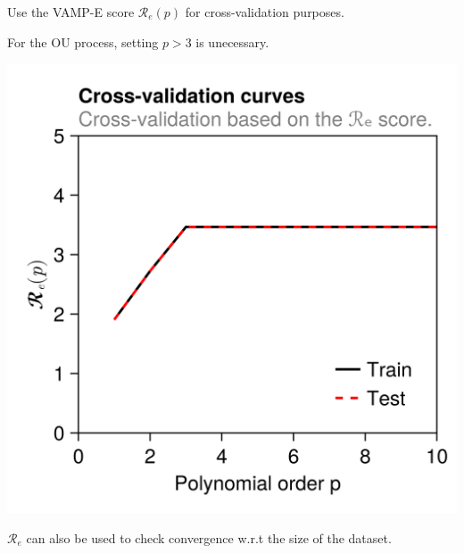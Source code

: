\documentclass[aspectratio=169, usenames, dvipsnames]{beamer}
\begin{document}
{  \begin{frame}
    \vfill
    \begin{minipage}{.48\textwidth}
      Use the VAMP-E score $\mathcal{R}_e(p)$ for cross-validation purposes.

      \bigskip
      
      For the OU process, setting $p > 3$ is unecessary.
    \end{minipage}%
    \hfill
    \begin{minipage}{.48\textwidth}
      \centering
      \includegraphics[width=\textwidth]{OU_process_cross_validation}
    \end{minipage}
    \vfill
  \end{frame}

  \begin{frame}
    \vfill
    \begin{minipage}{.48\textwidth}
      $\mathcal{R}_e$ can also be used to check convergence w.r.t the size of the dataset.

      \bigskip


\end{minipage}
\end{frame}}
\end{document}
